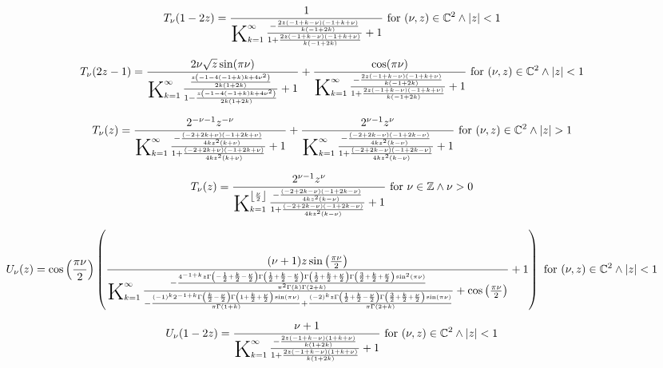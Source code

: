\documentclass{article}
\newcommand{\bigK}{\mathop{\raisebox{-5pt}{\huge K}}}
\begin{document}
\[T_{\nu }(1-2 z)=\frac{1}{\bigK_{k=1}^{\infty}\frac{-\frac{2 z (-1+k-\nu ) (-1+k+\nu )}{k (-1+2 k)}}{1+\frac{2 z (-1+k-\nu ) (-1+k+\nu )}{k (-1+2 k)}}+1}\text{ for }(\nu ,z)\in \mathbb{C}^2\land \left| z\right| <1\] 

\[T_{\nu }(2 z-1)=\frac{2 \nu  \sqrt{z} \sin (\pi  \nu )}{\bigK_{k=1}^{\infty}\frac{\frac{z \left(-1-4 (-1+k) k+4 \nu ^2\right)}{2 k (1+2 k)}}{1-\frac{z \left(-1-4 (-1+k) k+4 \nu ^2\right)}{2 k (1+2 k)}}+1}+\frac{\cos (\pi  \nu )}{\bigK_{k=1}^{\infty}\frac{-\frac{2 z (-1+k-\nu ) (-1+k+\nu )}{k (-1+2 k)}}{1+\frac{2 z (-1+k-\nu ) (-1+k+\nu )}{k (-1+2 k)}}+1}\text{ for }(\nu ,z)\in \mathbb{C}^2\land \left| z\right| <1\] 

\[T_{\nu }(z)=\frac{2^{-\nu -1} z^{-\nu }}{\bigK_{k=1}^{\infty}\frac{-\frac{(-2+2 k+\nu ) (-1+2 k+\nu )}{4 k z^2 (k+\nu )}}{1+\frac{(-2+2 k+\nu ) (-1+2 k+\nu )}{4 k z^2 (k+\nu )}}+1}+\frac{2^{\nu -1} z^{\nu }}{\bigK_{k=1}^{\infty}\frac{-\frac{(-2+2 k-\nu ) (-1+2 k-\nu )}{4 k z^2 (k-\nu )}}{1+\frac{(-2+2 k-\nu ) (-1+2 k-\nu )}{4 k z^2 (k-\nu )}}+1}\text{ for }(\nu ,z)\in \mathbb{C}^2\land \left| z\right| >1\] 

\[T_{\nu }(z)=\frac{2^{\nu -1} z^{\nu }}{\bigK_{k=1}^{\left\lfloor \frac{\nu }{2}\right\rfloor}\frac{-\frac{(-2+2 k-\nu ) (-1+2 k-\nu )}{4 k z^2 (k-\nu )}}{1+\frac{(-2+2 k-\nu ) (-1+2 k-\nu )}{4 k z^2 (k-\nu )}}+1}\text{ for }\nu \in \mathbb{Z}\land \nu >0\] 

\[U_{\nu }(z)=\cos \left(\frac{\pi  \nu }{2}\right) \left(\frac{(\nu +1) z \sin \left(\frac{\pi  \nu }{2}\right)}{\bigK_{k=1}^{\infty}\frac{-\frac{4^{-1+k} z \Gamma \left(-\frac{1}{2}+\frac{k}{2}-\frac{\nu }{2}\right) \Gamma \left(\frac{1}{2}+\frac{k}{2}-\frac{\nu }{2}\right) \Gamma \left(\frac{1}{2}+\frac{k}{2}+\frac{\nu }{2}\right) \Gamma \left(\frac{3}{2}+\frac{k}{2}+\frac{\nu }{2}\right) \sin ^2(\pi  \nu )}{\pi ^2 \Gamma (k) \Gamma (2+k)}}{-\frac{(-1)^k 2^{-1+k} \Gamma \left(\frac{k}{2}-\frac{\nu }{2}\right) \Gamma \left(1+\frac{k}{2}+\frac{\nu }{2}\right) \sin (\pi  \nu )}{\pi  \Gamma (1+k)}+\frac{(-2)^k z \Gamma \left(\frac{1}{2}+\frac{k}{2}-\frac{\nu }{2}\right) \Gamma \left(\frac{3}{2}+\frac{k}{2}+\frac{\nu }{2}\right) \sin (\pi  \nu )}{\pi  \Gamma (2+k)}}+\cos \left(\frac{\pi  \nu }{2}\right)}+1\right)\text{ for }(\nu ,z)\in \mathbb{C}^2\land \left| z\right| <1\] 

\[U_{\nu }(1-2 z)=\frac{\nu +1}{\bigK_{k=1}^{\infty}\frac{-\frac{2 z (-1+k-\nu ) (1+k+\nu )}{k (1+2 k)}}{1+\frac{2 z (-1+k-\nu ) (1+k+\nu )}{k (1+2 k)}}+1}\text{ for }(\nu ,z)\in \mathbb{C}^2\land \left| z\right| <1\] 
\end{document}
